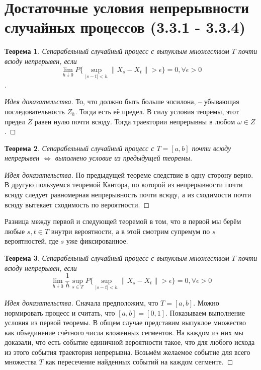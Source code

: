 \documentclass[16pt]{article}
\newtheorem{theorem}{Теорема}[section]
\theoremstyle{definition}
\begin{document}
\section{Достаточные условия непрерывности случайных процессов (3.3.1 - 3.3.4)}
\begin{theorem}
Сепарабельный случайный процесс с выпуклым множеством $T$ почти всюду непрерывен, если $$\lim_{h \downarrow 0}P\{\sup_{|s - t| < h} \|X_s - X_t\| > \epsilon\} = 0, \forall \epsilon > 0$$.
\end{theorem}
\begin{proof}[Идея доказательства]
То, что должно быть больше эпсилона, -- убывающая последовательность $Z_h$. Тогда есть её предел. В силу условия теоремы, этот предел $Z$ равен нулю почти всюду. Тогда траектории непрерывны в любом $\omega \in Z$.
\end{proof}
\begin{theorem}
Сепарабельный случайный процесс с $T = [a, b]$ почти всюду непрерывен $\Longleftrightarrow$ выполнено условие из предыдущей теоремы.
\end{theorem}
\begin{proof}[Идея доказательства]
По предыдущей теореме следствие в одну сторону верно. В другую пользуемся теоремой Кантора, по которой из непрерывности почти всюду следует равномерная непрерывность почти всюду, а из сходимости почти всюду вытекает сходимость по вероятности.
\end{proof}
Разница между первой и следующей теоремой в том, что в первой мы берём любые $s, t \in T$ внутри вероятности, а в этой смотрим супремум по $s$ вероятностей, где $s$ уже фиксированное.
\begin{theorem}
Сепарабельный случайный процесс с выпуклым множеством $T$ почти всюду непрерывен, если $$\lim_{h \downarrow 0}\frac{1}{h}\sup_{s \in T}P\{\sup_{|s - t| < h} \|X_s - X_t\| > \epsilon\} = 0, \forall \epsilon > 0$$
\end{theorem}
\begin{proof}[Идея доказательства]
Сначала предположим, что $T = [a, b]$. Можно нормировать процесс и считать, что $[a, b] = [0, 1]$. Показываем выполнение условия из первой теоремы. В общем случае представим выпуклое множество как объединение счётного числа вложенных сегментов. На каждом из них мы доказали, что есть событие единичной вероятности такое, что для любого исхода из этого события траектория непрерывна. Возьмём желаемое событие для всего множества $T$ как пересечение найденных событий на каждом сегменте.
\end{proof}
\end{document}
